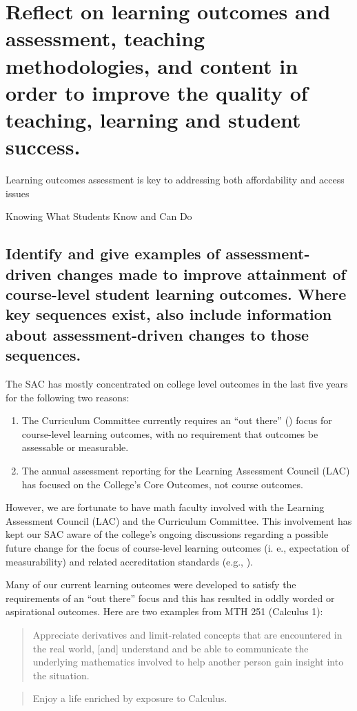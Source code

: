 \chapter[Outcomes and Assessment]{Reflect on learning outcomes and assessment,
  teaching methodologies, and content in order to improve the quality of teaching,
  learning and student success.}\label{chap:outcomes}
\epigraph{Learning outcomes assessment is key to addressing both affordability and access issues}
{Knowing What Students Know and Can Do \cite{outcomesquote}}

\section[Course-level outcomes]{Identify and give examples of assessment-driven
  changes made to improve attainment of course-level student learning outcomes.
  Where key sequences exist, also include information about assessment-driven changes to those sequences.
 }

The SAC has mostly concentrated on college level outcomes in the last five years for the following two reasons: \begin{enumerate} \item The Curriculum Committee currently requires an ``out there'' (\cite{courseoutcomes}) focus for course-level learning outcomes, with no requirement that outcomes be assessable or measurable.
	\item The annual assessment reporting for the Learning Assessment Council (LAC)
	      has focused on the College's Core Outcomes, not course outcomes.
\end{enumerate}

However, we are fortunate to have math faculty involved with the Learning Assessment Council (LAC) and the Curriculum Committee.
This involvement has kept our SAC aware of the college's ongoing discussions regarding a possible future change for the focus of course-level learning outcomes  (i.
e., expectation of
measurability) and related accreditation standards (e.g., \cite[Standard
	4.
	A.
	3]{NWCCU}).

Many of our current learning outcomes were developed to satisfy the requirements of an ``out there'' focus and this has resulted in oddly worded or aspirational outcomes.
Here are two examples from MTH 251 (Calculus 1): 

\begin{quote} Appreciate derivatives and limit-related concepts that are encountered in the real world, [and] understand and be able to communicate the underlying mathematics involved to help another person gain insight into the situation.
\end{quote}
\begin{quote}
	Enjoy a life enriched by exposure to Calculus.
\end{quote}

